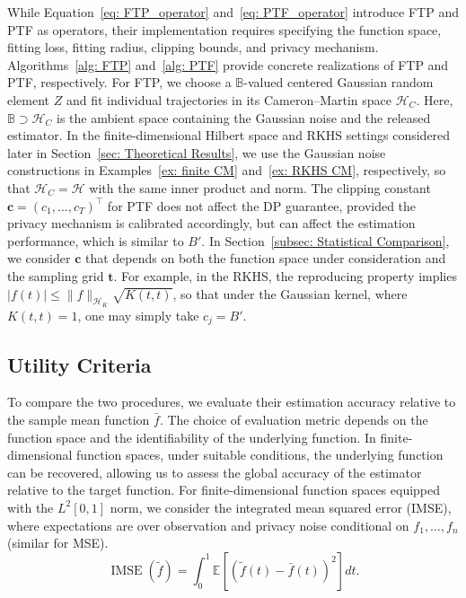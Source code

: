 \documentclass[twoside,11pt]{article}
\begin{document}
While Equation~\eqref{eq: FTP_operator} and~\eqref{eq: PTF_operator} introduce FTP and PTF as operators, their implementation requires specifying the function space, fitting loss, fitting radius, clipping bounds, and privacy mechanism. Algorithms~\ref{alg: FTP} and~\ref{alg: PTF} provide concrete realizations of FTP and PTF, respectively. For FTP, we choose a $\mathbb{B}$-valued centered Gaussian random element $Z$ and fit individual trajectories in its Cameron--Martin space $\mathcal H_C$. Here, $\mathbb B\supset\mathcal{H}_C$ is the ambient space containing the Gaussian noise and the released estimator. In the finite-dimensional Hilbert space and RKHS settings considered later in Section~\ref{sec: Theoretical Results}, we use the Gaussian noise constructions in Examples~\ref{ex: finite CM} and~\ref{ex: RKHS CM}, respectively, so that $\mathcal H_C=\mathcal H$ with the same inner product and norm. The clipping constant $\mathbf{c} = (c_1,\ldots,c_T)^\top$ for PTF does not affect the DP guarantee, provided the privacy mechanism is calibrated accordingly, but can affect the estimation performance, which is similar to $B'$. In Section~\ref{subsec: Statistical Comparison}, we consider $\mathbf{c}$ that depends on both the function space under consideration and the sampling grid $\mathbf{t}$. For example, in the RKHS, the reproducing property implies $|f(t)|\le\|f\|_{\mathcal H_K}\sqrt{K(t,t)}$, so that under the Gaussian kernel, where $K(t,t)=1$, one may simply take $c_j=B'$. 

\subsection{Utility Criteria}
\label{subsec: Utility Criteria}
To compare the two procedures, we evaluate their estimation accuracy relative to the sample mean function $\bar f$. The choice of evaluation metric depends on the function space and the identifiability of the underlying function. In finite-dimensional function spaces, under suitable conditions, the underlying function can be recovered, allowing us to assess the global accuracy of the estimator relative to the target function. For finite-dimensional function spaces equipped with the $L^2[0,1]$ norm, we consider the integrated mean squared error (IMSE), where expectations are over observation and privacy noise conditional on $f_1,\ldots,f_n$ (similar for MSE).
\begin{equation}
\operatorname{IMSE}(\widetilde{f})
=
\int_0^1
\mathbb E
\left[
(\widetilde f(t)-\bar f(t))^2
\right]
dt.
\label{eq: IMSE}
\end{equation}
\end{document}
